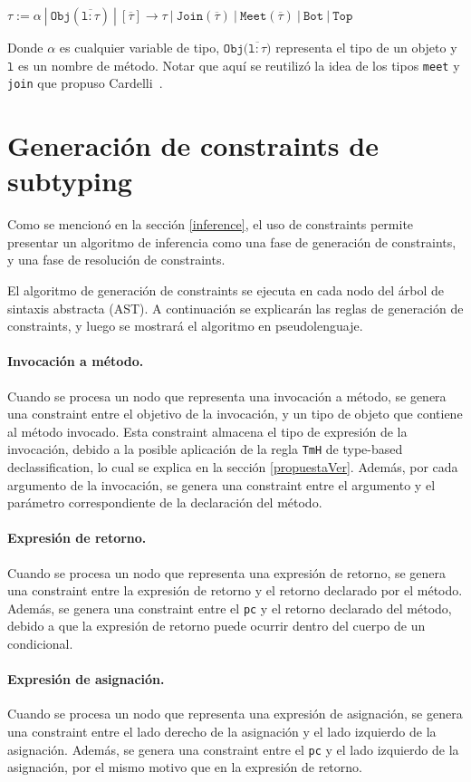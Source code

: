   $\mathtt{\tau := \alpha\ |\ Obj(\overline{l: \tau})\ |\ [\overline{\tau}] \rightarrow \tau \ |\ Join(\overline{\tau})\ |\ Meet(\overline{\tau})\ |\ Bot\ |\ Top}$

Donde $\alpha$ es cualquier variable de tipo, $\mathtt{Obj(\overline{l: \tau}})$ representa el tipo de un objeto y $\mathtt{l}$ es un nombre de método. Notar que aquí se reutilizó la idea de los tipos \texttt{meet} y \texttt{join} que propuso Cardelli~\cite{cardelli}.

\section{Generación de constraints de subtyping} \label{propuestaGen}
Como se mencionó en la sección \ref{inference}, el uso de constraints permite presentar un algoritmo de inferencia como una fase de generación de constraints, y una fase de resolución de constraints.

El algoritmo de generación de constraints se ejecuta en cada nodo del árbol de sintaxis abstracta (AST). A continuación se explicarán las reglas de generación de constraints, y luego se mostrará el algoritmo en pseudolenguaje.

\paragraph{Invocación a método.}Cuando se procesa un nodo que representa una invocación a método, se genera una constraint entre el objetivo de la invocación, y un tipo de objeto que contiene al método invocado. Esta constraint almacena el tipo de expresión de la invocación, debido a la posible aplicación de la regla \texttt{TmH} de type-based declassification, lo cual se explica en la sección \ref{propuestaVer}. Además, por cada argumento de la invocación, se genera una constraint entre el argumento y el parámetro correspondiente de la declaración del método.

\paragraph{Expresión de retorno.}Cuando se procesa un nodo que representa una expresión de retorno, se genera una constraint entre la expresión de retorno y el retorno declarado por el método. Además, se genera una constraint entre el \texttt{pc} y el retorno declarado del método, debido a que la expresión de retorno puede ocurrir dentro del cuerpo de un condicional.

\paragraph{Expresión de asignación.}Cuando se procesa un nodo que representa una expresión de asignación, se genera una constraint entre el lado derecho de la asignación y el lado izquierdo de la asignación. Además, se genera una constraint entre el \texttt{pc} y el lado izquierdo de la asignación, por el mismo motivo que en la expresión de retorno.

